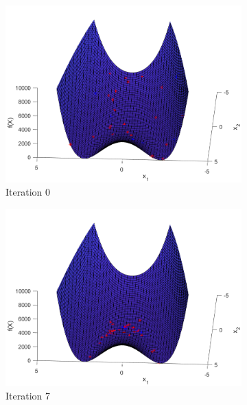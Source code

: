 \begin{figure}
  \begin{subfigure}[b]{0.4\textwidth}
    \includegraphics[width=\textwidth]{img/smpl/rosn2d-1-100/loa-iter-0}
    \caption{Iteration 0}
    \label{fig:s3-iter-0}
  \end{subfigure}
  \begin{subfigure}[b]{0.4\textwidth}
    \includegraphics[width=\textwidth]{img/smpl/rosn2d-1-100/loa-iter-7}
    \caption{Iteration 7}
    \label{fig:s3-iter-1}
  \end{subfigure}
  \begin{subfigure}[b]{0.4\textwidth}

\end{subfigure}
\end{figure}
